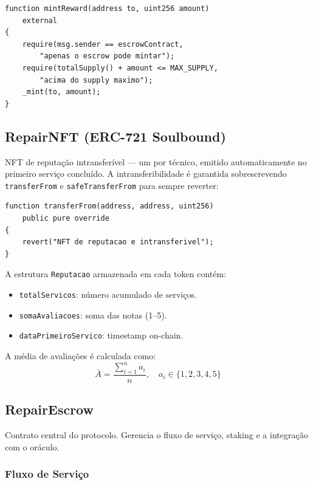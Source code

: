 \documentclass[
    12pt,
    a4paper,
    oneside,
    brazil,
    sumario=tradicional
]{abntex2}
\begin{document}
\begin{lstlisting}[language=Solidity, caption={Mint restrito ao Escrow}]
function mintReward(address to, uint256 amount)
    external
{
    require(msg.sender == escrowContract,
        "apenas o escrow pode mintar");
    require(totalSupply() + amount <= MAX_SUPPLY,
        "acima do supply maximo");
    _mint(to, amount);
}
\end{lstlisting}

\subsection{RepairNFT (ERC-721 Soulbound)}

NFT de reputação intransferível --- um por técnico, emitido
automaticamente no primeiro serviço concluído. A
intransferibilidade é garantida sobrescrevendo \texttt{transferFrom}
e \texttt{safeTransferFrom} para sempre reverter:

\begin{lstlisting}[language=Solidity, caption={Bloqueio de transferência}]
function transferFrom(address, address, uint256)
    public pure override
{
    revert("NFT de reputacao e intransferivel");
}
\end{lstlisting}

A estrutura \texttt{Reputacao} armazenada em cada token contém:
\begin{itemize}
    \item \texttt{totalServicos}: número acumulado de serviços.
    \item \texttt{somaAvaliacoes}: soma das notas (1--5).
    \item \texttt{dataPrimeiroServico}: timestamp on-chain.
\end{itemize}

A média de avaliações é calculada como:
$$\bar{A} = \frac{\displaystyle\sum_{i=1}^{n} a_i}{n}, \quad a_i \in \{1,2,3,4,5\}$$

\subsection{RepairEscrow}

Contrato central do protocolo. Gerencia o fluxo de serviço, staking e
a integração com o oráculo.

\subsubsection{Fluxo de Serviço}
\end{document}
